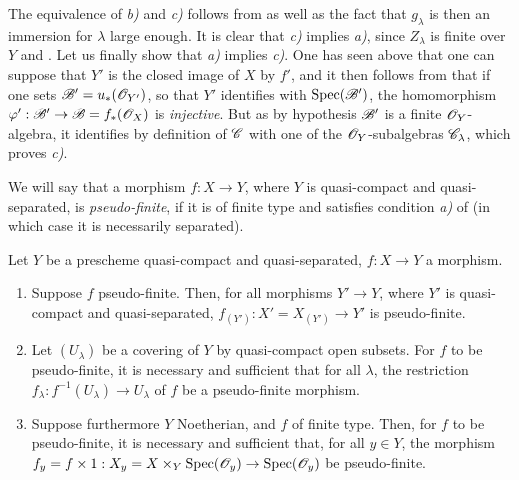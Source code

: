The equivalence of \emph{b)} and \emph{c)} follows from  as well as the fact that $g_\lambda$ is then an immersion for $\lambda$ large enough.
It is clear that \emph{c)} implies \emph{a)}, since $Z_\lambda$ is finite over $Y$  and .
Let us finally show that \emph{a)} implies \emph{c)}.
One has seen above that one can suppose that $Y'$ is the closed image of $X$ by $f'$, and it then follows from  that if one sets $\mathscr{B}'=u_*(\mathscr{O}_{Y'})$, so that $Y'$ identifies with $\operatorname{Spec}(\mathscr{B}')$, the homomorphism $\varphi':\mathscr{B}'\to\mathscr{B}=f_*(\mathscr{O}_X)$ is \emph{injective}.
But as by hypothesis $\mathscr{B}'$ is a finite $\mathscr{O}_Y$-algebra, it identifies by definition of $\mathscr{C}$ with one of the $\mathscr{O}_Y$-subalgebras $\mathscr{C}_\lambda$, which proves \emph{c)}.

We will say that a morphism $f:X\to Y$, where $Y$ is quasi-compact and quasi-separated, is \emph{pseudo-finite}, if it is of finite type and satisfies condition \emph{a)} of  (in which case it is necessarily separated).

\begin{corollary}[8.12.4]
\label{IV.8.12.4}
Let $Y$ be a prescheme quasi-compact and quasi-separated, $f:X\to Y$ a morphism.
\begin{enumerate}[label=(\roman*)]
  \item Suppose $f$ pseudo-finite.
Then, for all morphisms $Y'\to Y$, where $Y'$ is quasi-compact and quasi-separated, $f_{(Y')}:X'=X_{(Y')}\to Y'$ is pseudo-finite.
  \item Let $(U_\lambda)$ be a covering of $Y$ by quasi-compact open subsets.
For $f$ to be pseudo-finite, it is necessary and sufficient that for all $\lambda$, the restriction $f_\lambda:f^{-1}(U_\lambda)\to U_\lambda$ of $f$ be a pseudo-finite morphism.
  \item Suppose furthermore $Y$ Noetherian, and $f$ of finite type.
Then, for $f$ to be pseudo-finite, it is necessary and sufficient that, for all $y\in Y$, the morphism $f_y=f\times 1:X_y=X\times_Y\operatorname{Spec}(\mathscr{O}_y)\to\operatorname{Spec}(\mathscr{O}_y)$ be pseudo-finite.
\end{enumerate}
\end{corollary}

